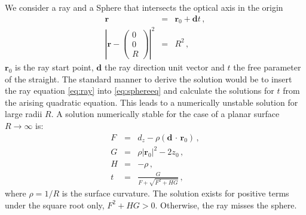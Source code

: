 \documentclass[12pt,a4paper,twoside,openright,BCOR10mm,headsepline,titlepage,abstracton,chapterprefix,final]{scrreprt}
\newcommand\Vector[1]{{\mathbf{#1}}}
\newcommand\Location{\Vector{r}}
\newcommand{\scpm}[2]{(#1\,\cdot\,#2)}
\begin{document}
We consider a ray and a Sphere that intersects the optical axis in the origin
\begin{eqnarray}
 \Location &=& \Location_0 + \Vector{d} t \label{eq:ray}\,,\\
 \left| \Location - \begin{pmatrix} 0 \\ 0 \\ R \end{pmatrix} \right|^2 &=& R^2\,, \label{eq:sphereeq}
\end{eqnarray}
$\Location_0$ is the ray start point, $\Vector{d}$ the ray direction unit vector and $t$ the free parameter of the straight.
The standard manner to derive the solution would be to insert the ray equation \eqref{eq:ray} into
\eqref{eq:sphereeq} and calculate the solutions for $t$ from the arising quadratic equation. This leads to a numerically unstable solution
for large radii $R$.
A solution numerically stable for the case of a planar surface $R \rightarrow \infty$ is:
\begin{subequations}
\label{eq:spheresolution}
\begin{eqnarray}
   F &=& d_z - \rho \scpm{\Vector{d}}{\Location_0}\,, \\
   G &=& \rho |\Location_0|^2 - 2 z_0\,, \\
   H &=& - \rho\,, \\
   t &=& \frac{G}{ F + \sqrt{F^2 + H G} }\,, \label{eq:tsolsphere}
\end{eqnarray}
\end{subequations}
where $\rho = 1 / R$ is the surface curvature. 
The solution exists for positive terms under the square root only, $F^2 + H G > 0$. 
Otherwise, the ray misses the sphere.
\end{document}
